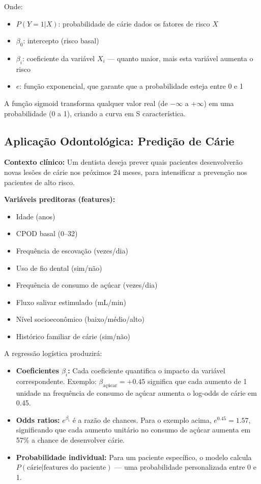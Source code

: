 Onde:
\begin{itemize}
    \item $P(Y=1|X)$: probabilidade de cárie dados os fatores de risco $X$
    \item $\beta_0$: intercepto (risco basal)
    \item $\beta_i$: coeficiente da variável $X_i$ — quanto maior, mais esta variável aumenta o risco
    \item $e$: função exponencial, que garante que a probabilidade esteja entre 0 e 1
\end{itemize}

A função sigmoid transforma qualquer valor real (de $-\infty$ a $+\infty$) em uma probabilidade (0 a 1), criando a curva em S característica.

\subsection{Aplicação Odontológica: Predição de Cárie}

\textbf{Contexto clínico:} Um dentista deseja prever quais pacientes desenvolverão novas lesões de cárie nos próximos 24 meses, para intensificar a prevenção nos pacientes de alto risco.

\textbf{Variáveis preditoras (features):}
\begin{itemize}
    \item Idade (anos)
    \item CPOD basal (0--32)
    \item Frequência de escovação (vezes/dia)
    \item Uso de fio dental (sim/não)
    \item Frequência de consumo de açúcar (vezes/dia)
    \item Fluxo salivar estimulado (mL/min)
    \item Nível socioeconômico (baixo/médio/alto)
    \item Histórico familiar de cárie (sim/não)
\end{itemize}

A regressão logística produzirá:
\begin{itemize}
    \item \textbf{Coeficientes $\beta_i$:} Cada coeficiente quantifica o impacto da variável correspondente. Exemplo: $\beta_{\text{açúcar}} = +0.45$ significa que cada aumento de 1 unidade na frequência de consumo de açúcar aumenta o log-odds de cárie em 0.45.
    \item \textbf{Odds ratios:} $e^{\beta_i}$ é a razão de chances. Para o exemplo acima, $e^{0.45} = 1.57$, significando que cada aumento unitário no consumo de açúcar aumenta em 57\% a chance de desenvolver cárie.
    \item \textbf{Probabilidade individual:} Para um paciente específico, o modelo calcula $P(\text{cárie} | \text{features do paciente})$ — uma probabilidade personalizada entre 0 e 1.
\end{itemize}

